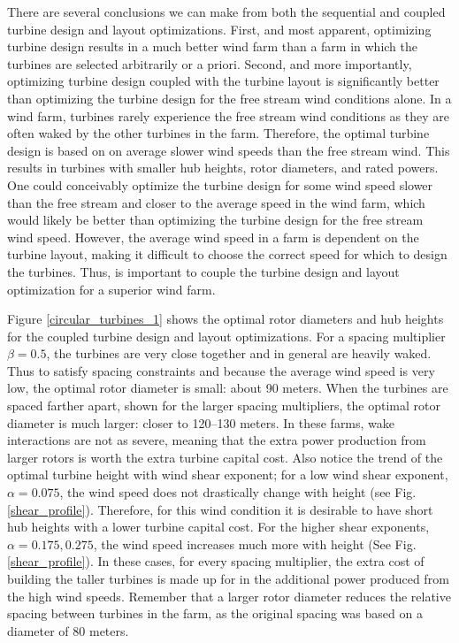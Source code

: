 \documentclass[WESD, manuscript]{copernicus}
\begin{document}
There are several conclusions we can make from both the sequential and coupled turbine design and layout optimizations. First, and most apparent, optimizing turbine design results in a much better wind farm than a farm in which the turbines are selected arbitrarily or a priori. Second, and more importantly, optimizing turbine design coupled with the turbine layout is significantly better than optimizing the turbine design for the free stream wind conditions alone. In a wind farm, turbines rarely experience the free stream wind conditions as they are often waked by the other turbines in the farm. Therefore, the optimal turbine design is based on on average slower wind speeds than the free stream wind. This results in turbines with smaller hub heights, rotor diameters, and rated powers. 
%
One could conceivably optimize the turbine design for some wind speed slower than the free stream and closer to the average speed in the wind farm, which would likely be better than optimizing the turbine design for the free stream wind speed. However, the average wind speed in a farm is dependent on the turbine layout, making it difficult to choose the correct speed for which to design the turbines. Thus, is important to couple the turbine design and layout optimization for a superior wind farm. 

Figure \ref{circular_turbines_1} shows the optimal rotor diameters and hub heights for the coupled turbine design and layout optimizations. For a spacing multiplier $\beta=0.5$, the turbines are very close together and in general are heavily waked. Thus to satisfy spacing constraints and because the average wind speed is very low, the optimal rotor diameter is small: about 90 meters. When the turbines are spaced farther apart, shown for the larger spacing multipliers, the optimal rotor diameter is much larger: closer to 120--130 meters. In these farms, wake interactions are not as severe, meaning that the extra power production from larger rotors is worth the extra turbine capital cost. Also notice the trend of the optimal turbine height with wind shear exponent; for a low wind shear exponent, $\alpha=0.075$, the wind speed does not drastically change with height (see Fig. \ref{shear_profile}). Therefore, for this wind condition it is desirable to have short hub heights with a lower turbine capital cost. For the higher shear exponents, $\alpha=0.175,0.275$, the wind speed increases much more with height (See Fig. \ref{shear_profile}). In these cases, for every spacing multiplier, the extra cost of building the taller turbines is made up for in the additional power produced from the high wind speeds. Remember that a larger rotor diameter reduces the relative spacing between turbines in the farm, as the original spacing was based on a diameter of 80 meters.
\end{document}
